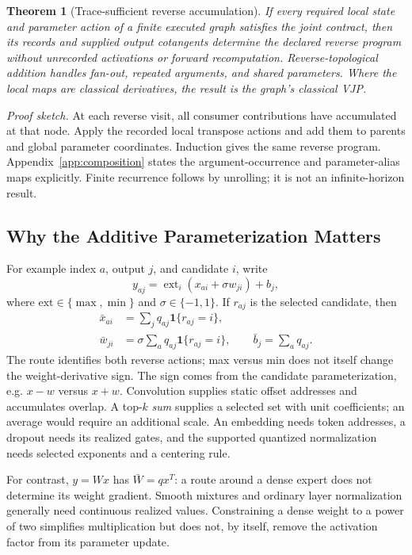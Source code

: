 \documentclass{article}
\theoremstyle{plain}
\newtheorem{theorem}{Theorem}[section]
\theoremstyle{definition}
\theoremstyle{remark}
\begin{document}
\begin{theorem}[Trace-sufficient reverse accumulation]
\label{thm:main}
If every required local state and parameter action of a finite executed
graph satisfies the joint contract, then its records and supplied output
cotangents determine the declared reverse program without unrecorded
activations or forward recomputation. Reverse-topological addition handles
fan-out, repeated arguments, and shared parameters. Where the local maps are
classical derivatives, the result is the graph's classical VJP.
\end{theorem}

\noindent\emph{Proof sketch.} At each reverse visit, all consumer
contributions have accumulated at that node. Apply the recorded local
transpose actions and add them to parents and global parameter coordinates.
Induction gives the same reverse program. Appendix~\ref{app:composition}
states the argument-occurrence and parameter-alias maps explicitly. Finite
recurrence follows by unrolling; it is not an infinite-horizon result.

\subsection{Why the Additive Parameterization Matters}

For example index $a$, output $j$, and candidate $i$, write
\begin{equation}
 y_{aj}=\mathop{\mathrm{ext}}_i(x_{ai}+\sigma w_{ji})+b_j,
\end{equation}
where $\mathrm{ext}\in\{\max,\min\}$ and $\sigma\in\{-1,1\}$.
If $r_{aj}$ is the selected candidate, then
\begin{align}
 \bar x_{ai}&=\sum_j q_{aj}\mathbf{1}\{r_{aj}=i\},\nonumber\\
 \bar w_{ji}&=\sigma\sum_a q_{aj}\mathbf{1}\{r_{aj}=i\},\qquad
 \bar b_j=\sum_a q_{aj}.
 \label{eq:main-route}
\end{align}
The route identifies both reverse actions; max versus min does not itself
change the weight-derivative sign. The sign comes from the candidate
parameterization, e.g. $x-w$ versus $x+w$.
Convolution supplies static offset addresses and accumulates overlap.
A top-$k$ \emph{sum} supplies a selected set with unit coefficients; an
average would require an additional scale. An embedding needs token
addresses, a dropout needs its realized gates, and the supported quantized
normalization needs selected exponents and a centering rule.

For contrast, $y=Wx$ has $\bar W=qx^T$: a route around a dense expert does
not determine its weight gradient. Smooth mixtures and ordinary layer
normalization generally need continuous realized values. Constraining a
dense weight to a power of two simplifies multiplication but does not, by
itself, remove the activation factor from its parameter update.
\end{document}
